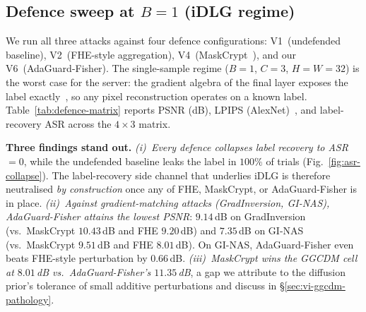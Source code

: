 
\subsection{Defence sweep at $B{=}1$ (iDLG regime)}
\label{sec:vi-defence-sweep}

We run all three attacks against four defence configurations:
V1~(undefended baseline), V2~(FHE-style aggregation),
V4~(MaskCrypt~\cite{maskcrypt2024}), and our V6~(AdaGuard-Fisher).
The single-sample regime ($B{=}1$, $C{=}3$, $H{=}W{=}32$) is the
worst case for the server: the gradient algebra of the final layer
exposes the label exactly~\cite{idlg2020}, so any pixel reconstruction
operates on a known label. Table~\ref{tab:defence-matrix} reports
PSNR (dB), LPIPS (AlexNet)~\cite{lpips2018}, and label-recovery ASR
across the $4{\times}3$ matrix.

\begin{table}[t]
  \centering
  \caption{Defence~$\times$~attack reconstruction quality at $B{=}1$.
  PSNR is computed against the original CIFAR-10 sample after
  per-attack normalization. \textbf{Bold} marks the strongest
  defence (lowest PSNR) per attack row, excluding undefended.}
  \label{tab:defence-matrix}
  
\end{table}

\textbf{Three findings stand out.}
\emph{(i)~Every defence collapses label recovery to ASR~$=0$}, while
the undefended baseline leaks the label in $100\%$ of trials
(Fig.~\ref{fig:asr-collapse}). The label-recovery side channel that
underlies iDLG is therefore neutralised \emph{by construction} once
any of FHE, MaskCrypt, or AdaGuard-Fisher is in place.
\emph{(ii)~Against gradient-matching attacks (GradInversion, GI-NAS),
AdaGuard-Fisher attains the lowest PSNR}: $9.14$\,dB on
GradInversion (vs.\ MaskCrypt $10.43$\,dB and FHE $9.20$\,dB) and
$7.35$\,dB on GI-NAS (vs.\ MaskCrypt $9.51$\,dB and FHE $8.01$\,dB).
On GI-NAS, AdaGuard-Fisher even beats FHE-style perturbation by
$0.66$\,dB.
\emph{(iii)~MaskCrypt wins the GGCDM cell at $8.01$\,dB
vs.\ AdaGuard-Fisher's $11.35$\,dB}, a gap we attribute to the
diffusion prior's tolerance of small additive perturbations and
discuss in §\ref{sec:vi-ggcdm-pathology}.

